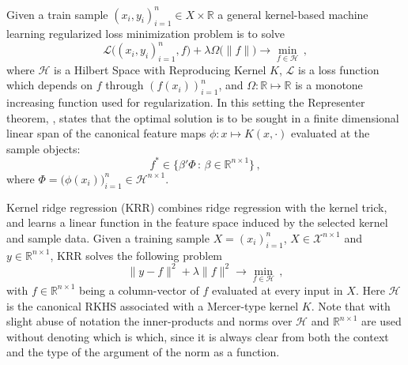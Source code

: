 \documentclass{ITaSconf}
\newcommand{\Hcal}{\mathcal{H}}
\newcommand{\Xcal}{\mathcal{X}}
\newcommand{\Real}{\mathbb{R}}
\newcommand{\Lcal}{\mathcal{L}}
\begin{document}
Given a train sample $(x_i, y_i)_{i=1}^n \in X\times \Real$ a general kernel-based
machine learning regularized loss minimization problem is to solve
\begin{equation}
  \Lcal\bigl((x_i, y_i)_{i=1}^n, f\bigr)
    + \lambda \Omega\bigl(\|f\|\bigr)
    \to \min_{f\in \Hcal} \,,
\end{equation}
where $\Hcal$ is a Hilbert Space with Reproducing Kernel $K$, $\Lcal$ is a loss
function which depends on $f$ through $(f(x_i))_{i=1}^n$, and $\Omega:\Real\mapsto\Real$
is a monotone increasing function used for regularization. In this setting the Representer
theorem, \cite{ref:rkhs_representer}, states that the optimal solution is to be sought
in a finite dimensional linear span of the canonical feature maps $\phi: x\mapsto K(x, \cdot)$
evaluated at the sample objects:
\begin{equation*}
  f^* \in \bigl\{ \beta'\Phi\,:\, \beta \in \Real^{n\times 1} \bigr\} \,,
\end{equation*}
where $\Phi = \bigl(\phi(x_i)\bigr)_{i=1}^n \in \Hcal^{n\times 1}$.

Kernel ridge regression (KRR) combines ridge regression with the kernel trick, and
learns a linear function in the feature space induced by the selected kernel and
sample data. Given a training sample $X = (x_i)_{i=1}^n$, $X\in \Xcal^{n\times 1}$
and $y \in \Real^{n\times 1}$, KRR solves the following problem
\begin{equation*}
  \|y - f\|^2 + \lambda \|f\|^2 \to \min_{f \in \Hcal} \,,
\end{equation*}
with $f \in \Real^{n\times 1}$ being a column-vector of $f$ evaluated at every input
in $X$. Here $\Hcal$ is the canonical RKHS associated with a Mercer-type kernel $K$.
Note that with slight abuse of notation the inner-products and norms over $\Hcal$
and $\Real^{n\times 1}$ are used without denoting which is which, since it is always
clear from both the context and the type of the argument of the norm as a function.
\end{document}
